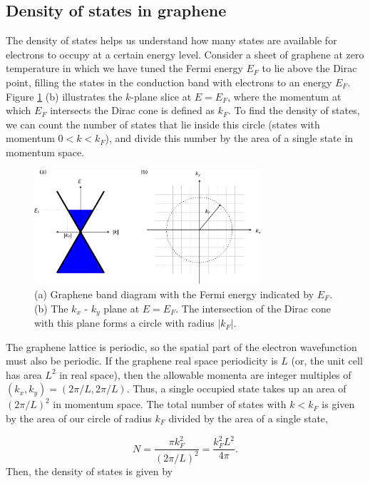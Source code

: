 \documentclass[double,12pt,1in]{beavtex}
\begin{document}
\subsection{Density of states in graphene}
The density of states helps us understand how many states are available for electrons to occupy at a certain energy level. Consider a sheet of graphene at zero temperature in which we have tuned the Fermi energy $E_F$ to lie above the Dirac point, filling the states in the conduction band with electrons to an energy $E_F$. Figure \ref{density of states graphic} (b) illustrates the $k$-plane slice at $E = E_F$, where the momentum at which $E_F$ intersects the Dirac cone is defined as $k_F$. To find the density of states, we can count the number of states that lie inside this circle (states with momentum $0 < k < k_F$), and divide this number by the area of a single state in momentum space.

\begin{figure}
    \includegraphics[width = 0.75\textwidth]{density of states graphic.pdf}
    \caption{(a) Graphene band diagram with the Fermi energy indicated by $E_F$. (b) The $k_x$ - $k_y$ plane at $E = E_F$. The intersection of the Dirac cone with this plane forms a circle with radius $|k_F|$.}
    \label{density of states graphic}
\end{figure}
The graphene lattice is periodic, so the spatial part of the electron wavefunction must also be periodic. If the graphene real space periodicity is $L$ (or, the unit cell has area $L^2$ in real space), then the allowable momenta are integer multiples of $(k_x, k_y) = (2\pi/L, 2\pi/L)$. Thus, a single occupied state takes up an area of $(2\pi/L)^2$ in momentum space. The total number of states with $k < k_F$ is given by the area of our circle of radius $k_F$ divided by the area of a single state,

\begin{equation}
    N = \frac{\pi k_F^2}{(2\pi/L)^2} = \frac{k_F^2 L^2}{4\pi}. 
\end{equation}
Then, the density of states is given by 
\end{document}

